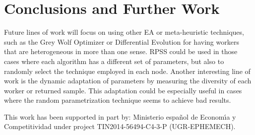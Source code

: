 \section{Conclusions and Further Work}
\label{sec:conclusions}


Future lines of work will focus on using other EA or 
meta-heuristic techniques, such as the Grey Wolf Optimizer 
or Differential Evolution for having workers that are 
heterogeneous in more than one sense. RPSS could be used 
in those cases where each algorithm has a different set of 
parameters, but also to randomly select the technique employed 
in each node. Another interesting line of work is the dynamic 
adaptation of parameters by measuring the diversity of each 
worker or returned sample. This adaptation could be especially 
useful in cases where the random parametrization technique 
seems to achieve bad results. 

\begin{acks}
This work has been supported in part by:  Ministerio espa\~{n}ol de
Econom\'{\i}a y Competitividad under project TIN2014-56494-C4-3-P
(UGR-EPHEMECH).
\end{acks}
